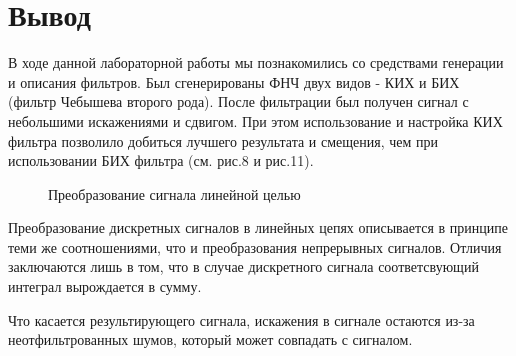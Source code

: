 \documentclass[12pt,a4paper]{scrartcl}
\begin{document}
\clearpage
\newpage

\section{Вывод}
\label{sec:afterWork}
В ходе данной лабораторной работы мы познакомились со средствами генерации и описания фильтров. Был сгенерированы ФНЧ двух видов - КИХ и БИХ (фильтр Чебышева второго рода).
После фильтрации был получен сигнал с небольшими искажениями и сдвигом. При этом использование и настройка КИХ фильтра позволило добиться лучшего результата и смещения, чем при использовании БИХ фильтра (см. рис.8 и рис.11).

\begin{figure}[h!]
\caption{Преобразование сигнала линейной целью}
\end{figure}

Преобразование дискретных сигналов в линейных цепях описывается в принципе теми же соотношениями, что и преобразования непрерывных сигналов. Отличия заключаются лишь в том, что в случае дискретного сигнала соответсвующий интеграл вырождается в сумму.

Что касается результирующего сигнала, искажения в сигнале остаются из-за неотфильтрованных шумов, который может совпадать с сигналом.
\end{document}
